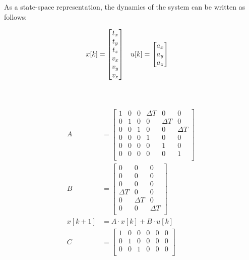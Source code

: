 \documentclass[bare_jrnl_transmag]{subfiles}
\begin{document}
As a state-space representation, the dynamics of the system can be written as follows:

\begin{align*}
    x[k] &= {\null\hbox{$\begin{bmatrix}
    t_x \\
    t_y \\
    t_z \\
    v_x \\
    v_y \\
    v_z
    \end{bmatrix}$}}
    \quad
    u[k] = {\null\hbox{$\begin{bmatrix}
    a_x \\
    a_y \\
    a_z
    \end{bmatrix}$}}
    \end{align*}

    \\
    \\

    \begin{align*}
        A &= 
        \begin{bmatrix}
        1 & 0 & 0 & \Delta T & 0 & 0 \\
        0 & 1 & 0 & 0 & \Delta T & 0 \\
        0 & 0 & 1 & 0 & 0 & \Delta T \\
        0 & 0 & 0 & 1 & 0 & 0 \\
        0 & 0 & 0 & 0 & 1 & 0 \\
        0 & 0 & 0 & 0 & 0 & 1 \\
        \end{bmatrix}
        \\[1em]
        B &=
        \begin{bmatrix}
        0 & 0 & 0 \\
        0 & 0 & 0 \\
        0 & 0 & 0 \\
        \Delta T & 0 & 0 \\
        0 & \Delta T & 0 \\
        0 & 0 & \Delta T \\
        \end{bmatrix}
        \\[1em]
        x[k+1] &= A \cdot x[k] + B \cdot u[k]
        \\[1em]
        C &=
        \begin{bmatrix}
        1 & 0 & 0 & 0 & 0 & 0 \\
        0 & 1 & 0 & 0 & 0 & 0 \\
        0 & 0 & 1 & 0 & 0 & 0 \\
        \end{bmatrix}
    \end{align*}
\end{document}
